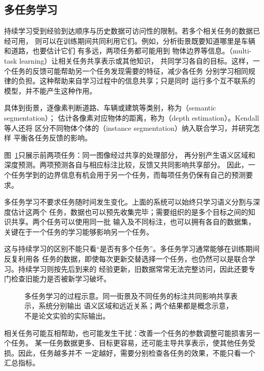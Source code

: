 \subsection{多任务学习}
\label{sec:multi-task-learning}

持续学习受到经验到达顺序与历史数据可访问性的限制。若多个相关任务的数据已经可用，
则可以在训练期间共同利用它们。例如，分析街景既要知道哪里是车辆和道路，也要估计它们
有多远，两项任务都可能用到
物体边界等信息。（multi-task learning）让相关任务共享表示或其他知识，
共同学习各自的目标。这样，一个任务的反馈可能帮助另一个任务发现需要的特征，减少各任务
分别学习相同规律的负担。这种帮助来自学习过程中的信息共享；只是同时
运行多个互不联系的模型，并不能产生这种作用。

具体到街景，逐像素判断道路、车辆或建筑等类别，称为（semantic segmentation）；
估计各像素对应物体的距离，称为（depth estimation）。Kendall等人还将
区分不同物体个体的（instance segmentation）纳入联合学习，并研究怎样
平衡各任务反馈的影响。

图~\ref{fig:multi-task-learning-process}只展示前两项任务：同一图像经过共享的处理部分，
再分别产生语义区域和深度预测。两项预测各自与相应标注比较，反馈又共同影响共享部分。
因此，一个任务学到的边界信息有机会用于另一个任务，而每项任务仍保有自己的预测要求。

多任务学习不要求任务随时间发生变化。上面的系统可以始终只学习语义分割与深度估计这两个
任务，数据也可以预先收集完毕；需要组织的是多个目标之间的知识共享。两个任务可以使用同一批
输入及不同标注，也可以拥有各自的数据集，关键在于一个任务的学习能够影响另一个任务。

这与持续学习的区别不能只看“是否有多个任务”。多任务学习通常能够在训练期间反复利用各
任务的数据，即使每次更新交替选择一个任务，也仍然可以是联合学习。持续学习则按先后到来的
经验更新，旧数据常常无法完整访问，因此还要专门检查旧能力是否被新学习破坏。

\begin{figure}[!htb]
  \centering
  \caption{多任务学习的过程示意。同一街景及不同任务的标注共同影响共享表示，系统分别输出
  语义区域和远近关系；两个结果都是概念示意，不是论文实验的实际输出。}
  \label{fig:multi-task-learning-process}
\end{figure}
\FloatBarrier

相关任务可能互相帮助，也可能发生干扰：改善一个任务的参数调整可能损害另一个任务。
某一任务数据更多、目标更容易，还可能主导共享表示，使其他任务受损。因此，任务越多并不
一定越好，需要分别检查各任务的效果，不能只看一个汇总指标。

